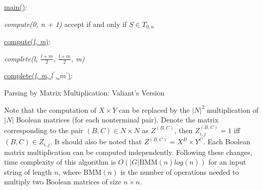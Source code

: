 \begin{algorithm}[h]
\SetAlgoNoLine
{}
\underline{main()}{:}{

 \textit{compute(0, n + 1)\;}
 accept if and only if $S \in T_{0, n}$
 \linebreak
 }

\underline{compute(\textit{l, m})}{:}{

 \textit{complete(l, $\frac{l+m}{2}$, $\frac{l+m}{2}$, m)}
 \linebreak
 }

\underline{complete(\textit{l, m}, $l^\prime$, $m^\prime$)}{:}{

 }
\caption{Parsing by Matrix Multiplication: Valiant's Version}
\label{algo:valiant}
\end{algorithm}



Note that the computation of $X \times Y$  can be replaced by the $|N|^2$ multiplication of $|N|$ Boolean matrices (for each nonterminal pair).
Denote the matrix corresponding to the pair $(B, C) \in N \times N$ as $Z^{(B, C)}$, then $Z_{i, j}^{(B, C)} = 1$ iff $(B, C) \in Z_{i, j}$.
It should also be noted that $Z^{(B, C)} = X^{B} \times Y^{C}$.
Each Boolean matrix multiplication can be computed independently.
Following these changes, time complexity of this algorithm is $O(|G|\mathrm{BMM}(n)log(n))$ for an input string of length $n$, where $\mathrm{BMM}(n)$ is the number of operations needed to multiply two Boolean matrices of size $n \times n$.

